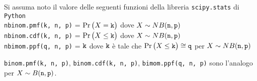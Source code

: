 \documentclass[11pt,twoside,a4paper]{article}
\begin{document}
Si assuma noto il valore delle seguenti funzioni della libreria {\tt scipy.stats\/} di  {\tt Python\/}\\
{\tt nbinom.pmf(k, n, p)} = $\Pr\big(X={\tt k}\big)$ dove $X\sim NB({\tt n},{\tt p})$\\
{\tt nbinom.cdf(k, n, p)} = $\Pr\big(X\le{\tt k}\big)$ dove  $X\sim NB({\tt n},{\tt p})$ \\
{\tt nbimom.ppf(q, n, p)} = ${\tt k}$ dove ${\tt k}$ è tale che $\Pr\big(X\le{\tt k}\big)\cong{\tt q}$ per $X\sim NB({\tt n},{\tt p})$ 

{\tt binom.pmf(k, n, p)}, {\tt binom.cdf(k, n, p)}, {\tt bimom.ppf(q, n, p)} sono l'analogo per $X\sim B({\tt n},{\tt p})$.
\end{document}
